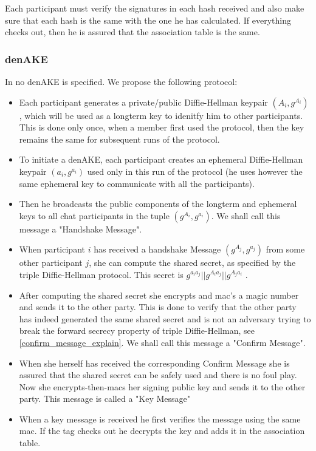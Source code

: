 Each participant must verify the signatures in each hash received and also make sure that each hash is the same with the one he has calculated. If everything checks out, then he is assured that the association table is the same.

\subsubsection{denAKE}
In \cite{mpotr} no denAKE is specified. We propose the following protocol:

\begin{itemize}

	\item[] Each participant generates a private/public Diffie-Hellman keypair $(A_i, g^{A_i})$, which will be used as a longterm key to idenitfy him to other participants. This
is done only once, when a member first used the protocol, then the key remains
the same for subsequent runs of the protocol.

	\item[] To initiate a denAKE, each participant creates an ephemeral Diffie-Hellman keypair
		$(a_i,g^{a_i})$ used only in this run of the protocol (he uses however the same ephemeral key
		to communicate with all the participants).

	\item[] Then he broadcasts the public components of the longterm and ephemeral keys to
		all chat participants in the tuple $(g^{A_i}, g^{a_i})$. We shall call this
		message a "Handshake Message".

	\item[] When participant $i$ has received a handshake Message $(g^{A_j}, g^{a_j})$ from some
		other participant $j$, she can compute the shared secret, as specified by the triple
		Diffie-Hellman protocol. This secret is $g^{a_ia_j} || g^{A_ia_j} || g^{A_ja_i}$
		.

	\item[] After computing the shared secret she encrypts and mac's a magic number and sends it
		to the other party. This is done to verify that the other party has indeed generated
		the same shared secret and is not an adversary trying to break the forward secrecy
		property of triple Diffie-Hellman, see \ref{confirm_message_explain}. We shall call
		this message a "Confirm Message".

	\item[] When she herself has received the corresponding Confirm Message she is assured that
		the shared secret can be safely used and there is no foul play. Now she
		encrypts-then-macs her signing public key and sends it to the other party. This
		message is called a "Key Message"


	\item[] When a key message is received he first verifies the message using the same mac.
		If the tag checks out he decrypts the key and adds it in the association table.
\end{itemize}

